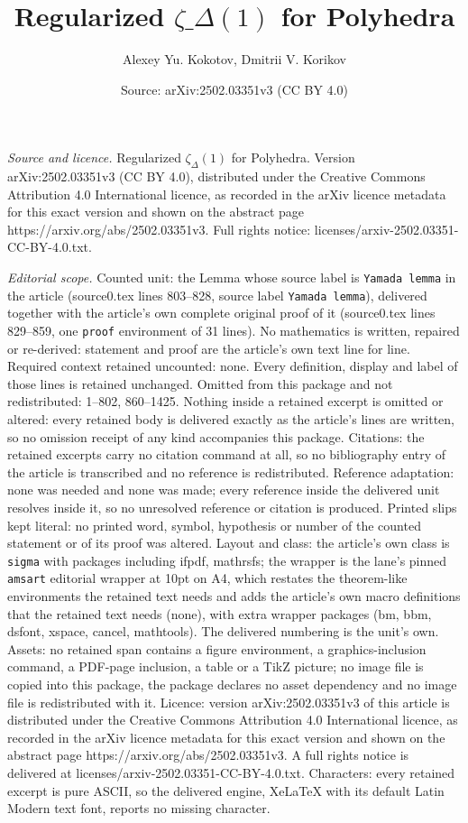 \documentclass[10pt,a4paper]{amsart}
\title[Regularized $\zeta\_{\Delta}(1)$ for Polyhedra]{Regularized $\zeta\_{\Delta}(1)$ for Polyhedra}
\author{Alexey Yu. Kokotov, Dmitrii V. Korikov}
\date{Source: arXiv:2502.03351v3 (CC BY 4.0)}
\begin{document}
\maketitle

\noindent\emph{Source and licence.} Regularized $\zeta_{\Delta}(1)$ for Polyhedra. Version arXiv:2502.03351v3 (CC BY 4.0), distributed under the Creative Commons Attribution 4.0 International licence, as recorded in the arXiv licence metadata for this exact version and shown on the abstract page https://arxiv.org/abs/2502.03351v3. Full rights notice: licenses/arxiv-2502.03351-CC-BY-4.0.txt.\par\smallskip

\noindent\textit{Editorial scope.} Counted unit: the Lemma whose source label is \texttt{Yamada lemma} in the article (source0.tex lines 803--828, source label \texttt{Yamada lemma}), delivered together with the article's own complete original proof of it (source0.tex lines 829--859, one \texttt{proof} environment of 31 lines). No mathematics is written, repaired or re-derived: statement and proof are the article's own text line for line. Required context retained uncounted: none. Every definition, display and label of those lines is retained unchanged. Omitted from this package and not redistributed: 1--802, 860--1425. Nothing inside a retained excerpt is omitted or altered: every retained body is delivered exactly as the article's lines are written, so no omission receipt of any kind accompanies this package. Citations: the retained excerpts carry no citation command at all, so no bibliography entry of the article is transcribed and no reference is redistributed. Reference adaptation: none was needed and none was made; every reference inside the delivered unit resolves inside it, so no unresolved reference or citation is produced. Printed slips kept literal: no printed word, symbol, hypothesis or number of the counted statement or of its proof was altered. Layout and class: the article's own class is \texttt{sigma} with packages including ifpdf, mathrsfs; the wrapper is the lane's pinned \texttt{amsart} editorial wrapper at 10pt on A4, which restates the theorem-like environments the retained text needs and adds the article's own macro definitions that the retained text needs (none), with extra wrapper packages (bm, bbm, dsfont, xspace, cancel, mathtools). The delivered numbering is the unit's own. Assets: no retained span contains a figure environment, a graphics-inclusion command, a PDF-page inclusion, a table or a TikZ picture; no image file is copied into this package, the package declares no asset dependency and no image file is redistributed with it. Licence: version arXiv:2502.03351v3 of this article is distributed under the Creative Commons Attribution 4.0 International licence, as recorded in the arXiv licence metadata for this exact version and shown on the abstract page https://arxiv.org/abs/2502.03351v3. A full rights notice is delivered at licenses/arxiv-2502.03351-CC-BY-4.0.txt. Characters: every retained excerpt is pure ASCII, so the delivered engine, XeLaTeX with its default Latin Modern text font, reports no missing character.
\end{document}
